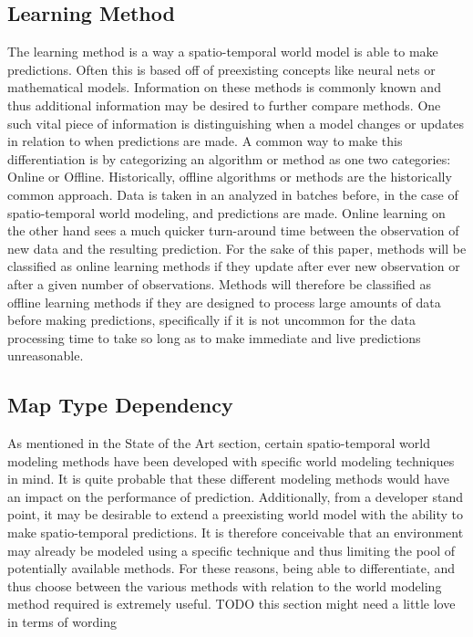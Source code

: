  \subsection{ Learning Method }
  The learning method is a way a spatio-temporal world model is able to
  make predictions. Often this is based off of preexisting concepts like neural
  nets or mathematical models. Information on these methods is commonly known
  and thus additional information may be desired to further compare methods.
  One such vital piece of information is distinguishing when a model
  changes or updates in relation to when predictions are made. A common way to
  make this differentiation is by categorizing an algorithm or method as one
  two categories: Online or Offline. Historically, offline algorithms or methods are the
  historically common approach. Data is taken in an analyzed in batches before,
  in the case of spatio-temporal world modeling, and predictions are made. Online
  learning on the other hand sees a much quicker turn-around time between the
  observation of new data and the resulting prediction. \cite{Karp1992} For the sake of this
  paper, methods will be classified as online learning methods if they update
  after ever new observation or after a given number of observations. Methods
  will therefore be classified as offline learning methods if they are designed to
  process large amounts of data before making predictions, specifically if it
  is not uncommon for the data processing time to take so long as to make
  immediate and live predictions unreasonable.

  \subsection{ Map Type Dependency }
  As mentioned in the State of the Art section, certain spatio-temporal world
  modeling methods have been developed with specific world modeling techniques in
  mind. It is quite probable that these different modeling methods would
  have an impact on the performance of prediction. Additionally,
  from a developer stand point, it may be desirable to extend a preexisting
  world model with the ability to make spatio-temporal predictions. It is
  therefore conceivable that an environment may already be modeled using a
  specific technique and thus limiting the pool of potentially available methods.
  For these reasons, being able to differentiate, and thus choose
  between the various methods with relation to the world modeling method
  required is extremely useful. TODO this section might need a little love in terms of wording



